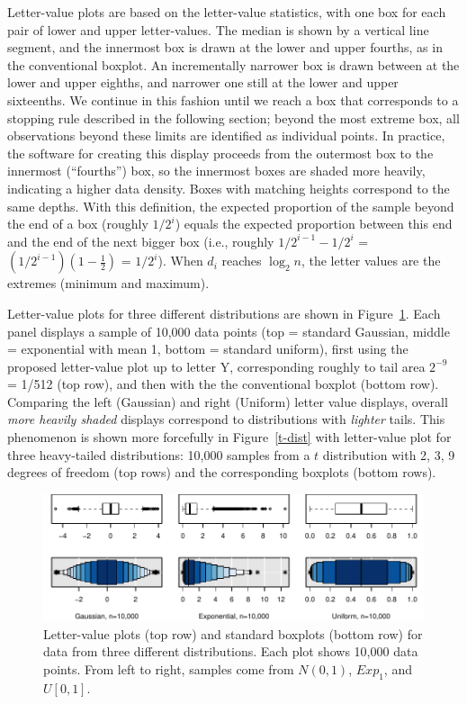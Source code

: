 \documentclass[oneside]{article}
\begin{document}
Letter-value plots are based on the letter-value statistics, with one box for each pair of lower and upper letter-values. The median is shown by a vertical line segment, and the innermost box is drawn at the lower and upper fourths, as in the conventional boxplot. An incrementally narrower box is drawn between at the lower and upper eighths, and narrower one still at the lower and upper sixteenths. We continue in this fashion until we reach a box that corresponds to a stopping rule described in the following section; beyond the most extreme box, all observations beyond these limits are identified as individual points. In practice, the software for creating this display proceeds from the outermost box to the innermost (``fourths'') box, so the innermost boxes are shaded more heavily, indicating a higher data density. Boxes with matching heights correspond to the same depths. With this definition, the expected proportion of the sample beyond the end of a box (roughly $1/2^i$) equals the expected proportion between this end and the end of the next bigger box (i.e., roughly $1/2^{i-1} - 1/2^i$ = $(1/2^{i-1})(1 - \frac{1}{2})$ = $1 / 2^i$). When $d_i$ reaches $\log_2 n$, the letter values are the extremes (minimum and maximum).

Letter-value plots for three different distributions are shown in Figure~\ref{stackbox}. Each panel displays a sample of 10,000 data points (top = standard Gaussian, middle = exponential with mean 1, bottom = standard uniform), first using the proposed letter-value plot up to letter Y, corresponding roughly to tail area $2^{-9}$ = 1/512 (top row), and then with the the conventional boxplot (bottom row). Comparing the left (Gaussian) and right (Uniform) letter value displays, overall \textit{more heavily shaded} displays correspond to distributions with \textit{lighter} tails. This phenomenon is shown more forcefully in Figure~\ref{t-dist} with letter-value plot for three heavy-tailed distributions: 10,000 samples from a $t$ distribution with 2, 3, 9 degrees of freedom (top rows) and the corresponding boxplots (bottom rows).

\begin{figure}[hbtp]
  \centering
  \includegraphics[width = \linewidth]{boxplots}

  \caption{Letter-value plots (top row) and standard boxplots (bottom
  row) for data from three different distributions. Each plot shows 10,000
  data points. From left to right, samples come from $N(0,1)$, $Exp_1$, and
  $U[0,1]$. }
  \label{stackbox}
\end{figure}
\end{document}
